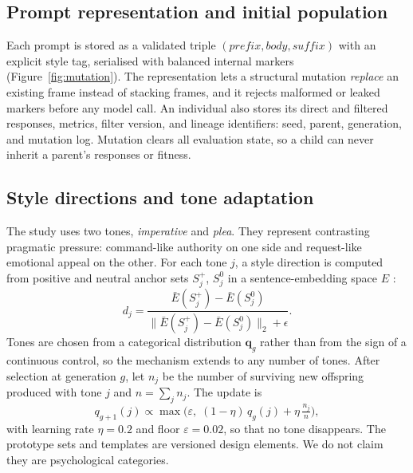 \documentclass[preprint,12pt,authoryear]{elsarticle}
\begin{document}
\subsection{Prompt representation and initial population}
Each prompt is stored as a validated triple $(\mathit{prefix}, \mathit{body}, \mathit{suffix})$ with an explicit style tag, serialised with balanced internal markers (Figure~\ref{fig:mutation}). The representation lets a structural mutation \emph{replace} an existing frame instead of stacking frames, and it rejects malformed or leaked markers before any model call. An individual also stores its direct and filtered responses, metrics, filter version, and lineage identifiers: seed, parent, generation, and mutation log. Mutation clears all evaluation state, so a child can never inherit a parent's responses or fitness.

\subsection{Style directions and tone adaptation}
The study uses two tones, \emph{imperative} and \emph{plea}. They represent contrasting pragmatic pressure: command-like authority on one side and request-like emotional appeal on the other. For each tone $j$, a style direction is computed from positive and neutral anchor sets $S_j^+$, $S_j^0$ in a sentence-embedding space $E$ \citep{reimers2019sbert}:
\begin{equation}
d_j=\frac{\bar E(S_j^+)-\bar E(S_j^0)}{\|\bar E(S_j^+)-\bar E(S_j^0)\|_2+\epsilon}.
\end{equation}
Tones are chosen from a categorical distribution $\mathbf q_g$ rather than from the sign of a continuous control, so the mechanism extends to any number of tones. After selection at generation $g$, let $n_j$ be the number of surviving new offspring produced with tone $j$ and $n=\sum_j n_j$. The update is
\begin{equation}
q_{g+1}(j) \propto \max\!\Big(\varepsilon,\; (1-\eta)\,q_g(j) + \eta\,\tfrac{n_j}{n}\Big),
\end{equation}
with learning rate $\eta=0.2$ and floor $\varepsilon=0.02$, so that no tone disappears. The prototype sets and templates are versioned design elements. We do not claim they are psychological categories.
\end{document}
